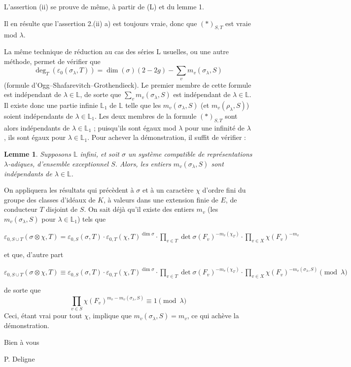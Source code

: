 \documentclass[11pt,a4paper]{article}
\theoremstyle{plain}
\newtheorem{lemma}[theorem]{Lemme}
\begin{document}
L'assertion (ii) se prouve de m\^eme, \`a partir de (L) et du lemme 1.

Il en r\'esulte que l'assertion 2.(ii) a) est toujours vraie, donc que $(*)_{S,T}$ est vraie mod $\lambda$.

\newpage

La m\^eme technique de r\'eduction au cas des s\'eries L usuelles, ou une autre m\'ethode, permet de v\'erifier que
\[
\deg_T(\varepsilon_0(\sigma_\lambda, T)) = \dim(\sigma)(2 - 2g) - \sum_v m_v(\sigma_\lambda, S)
\]
(formule d'Ogg--Shafarevitch--Grothendieck). Le premier membre de cette formule est ind\'ependant de $\lambda \in \mathbb{L}$, de sorte que $\sum_v m_v(\sigma_\lambda, S)$ est ind\'ependant de $\lambda \in \mathbb{L}$. Il existe donc une partie infinie $\mathbb{L}_1$ de $\mathbb{L}$ telle que les $m_v(\sigma_\lambda, S)$ (et $m_v(\rho_\lambda, S)$) soient ind\'ependants de $\lambda \in \mathbb{L}_1$. Les deux membres de la formule $(*)_{S,T}$ sont alors ind\'ependants de $\lambda \in \mathbb{L}_1$ ; puisqu'ils sont \'egaux mod $\lambda$ pour une infinit\'e de $\lambda$, ils sont \'egaux pour $\lambda \in \mathbb{L}_1$. Pour achever la d\'emonstration, il suffit de v\'erifier :

\begin{lemma}
Supposons $\mathbb{L}$ infini, et soit $\sigma$ un syst\`eme compatible de repr\'esentations $\lambda$-adiques, d'ensemble exceptionnel $S$. Alors, les entiers $m_v(\sigma_\lambda, S)$ sont ind\'ependants de $\lambda \in \mathbb{L}$.
\end{lemma}

On appliquera les r\'esultats qui pr\'ec\`edent \`a $\sigma$ et \`a un caract\`ere $\chi$ d'ordre fini du groupe des classes d'id\'eaux de $K$, \`a valeurs dans une extension finie de $E$, de conducteur $T$ disjoint de $S$. On sait d\'ej\`a qu'il existe des entiers $m_v$ (les $m_v(\sigma_\lambda, S)$ pour $\lambda \in \mathbb{L}_1$) tels que

$\varepsilon_{0,S \cup T}(\sigma \otimes \chi, T) = \varepsilon_{0,S}(\sigma, T) \cdot \varepsilon_{0,T}(\chi, T)^{\dim \sigma} \cdot \prod_{v \in T} \det \sigma(F_v)^{-m_v(\chi_T)} \cdot \prod_{v \in X} \chi(F_v)^{-m_v}$

et que, d'autre part

$\varepsilon_{0,S \cup T}(\sigma \otimes \chi, T) \equiv \varepsilon_{0,S}(\sigma, T) \cdot \varepsilon_{0,T}(\chi, T)^{\dim \sigma} \cdot \prod_{v \in T} \det \sigma(F_v)^{-m_v(\chi_T)} \cdot \prod_{v \in X} \chi(F_v)^{-m_v(\sigma_\lambda, S)} \pmod{\lambda}$

de sorte que
\[
\prod_{v \in S} \chi(F_v)^{m_v - m_v(\sigma_\lambda, S)} \equiv 1 \pmod{\lambda}
\]
Ceci, \'etant vrai pour tout $\chi$, implique que $m_v(\sigma_\lambda, S) = m_v$, ce qui ach\`eve la d\'emonstration.

\vspace{1cm}

\begin{flushright}
Bien \`a vous

\vspace{0.5cm}

P. Deligne
\end{flushright}
\end{document}
